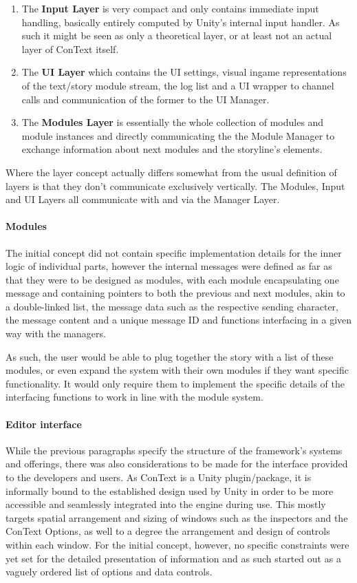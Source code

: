 \begin{enumerate}
\item The \textbf{Input Layer} is very compact and only contains immediate input handling,  basically entirely computed by Unity's internal input handler. As such it might be seen as only a theoretical layer, or at least not an actual layer of ConText itself.
\item The \textbf{UI Layer} which contains the UI settings, visual ingame representations of the text/story module stream, the log list and a UI wrapper to channel calls and communication of the former to the UI Manager.
\item The \textbf{Modules Layer} is essentially the whole collection of modules and module instances and directly communicating the the Module Manager to exchange information about next modules and the storyline's elements.
\end{enumerate}
Where the layer concept actually differs somewhat from the usual definition of layers is that they don't communicate exclusively vertically. The Modules, Input and UI Layers all communicate with and via the Manager Layer.
\paragraph{Modules} The initial concept did not contain specific implementation details for the inner logic of individual parts, however the internal messages were defined as far as that they were to be designed as modules, with each module encapsulating one message and containing pointers to both the previous and next modules, akin to a double-linked list, the message data such as the respective sending character, the message content and a unique message ID and functions interfacing in a given way with the managers. 

As such, the user would be able to plug together the story with a list of these modules, or even expand the system with their own modules if they want specific functionality. It would only require them to implement the specific details of the interfacing functions to work in line with the module system. 
\paragraph{Editor interface} While the previous paragraphs specify the structure of the framework's systems and offerings, there was also considerations to be made for the interface provided to the developers and users. As ConText is a Unity plugin/package, it is informally bound to the established design used by Unity in order to be more accessible and seamlessly integrated into the engine during use. This mostly targets spatial arrangement and sizing of windows such as the inspectors and the ConText Options, as well to a degree the arrangement and design of controls within each window. For the initial concept, however, no specific constraints were yet set for the detailed presentation of information and as such started out as a vaguely ordered list of options and data controls.

